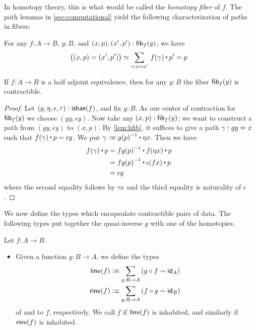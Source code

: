 In homotopy theory, this is what would be called the \emph{homotopy fiber} of $f$.
The path lemmas in \autoref{sec:computational} yield the following characterization of paths in fibers:

\begin{lem}\label{lem:hfib}
  For any $f : A \to B$, $y : B$, and $(x,p),(x',p') : {\mathsf{fib}}_{f}(y)$, we have
  \[ \big((x,p) = (x',p')\big) \simeq \sm{\gamma : x = x'} f(\gamma) \ct p' = p \qedhere\]
\end{lem}

\begin{thm}\label{thm:contr-hae}
  If $f:A\to B$ is a half adjoint equivalence, then for any $y:B$ the fiber ${\mathsf{fib}}_{f}(y)$ is contractible.
\end{thm}
\begin{proof}
  Let $(g,\eta,\epsilon,\tau) : \mathsf{ishae}(f)$, and fix $y : B$.
  As our center of contraction for ${\mathsf{fib}}_{f}(y)$ we choose $(gy, \epsilon y)$.
  Now take any $(x,p) : {\mathsf{fib}}_{f}(y)$; we want to construct a path from $(gy, \epsilon y)$ to $(x,p)$.
  By \autoref{lem:hfib}, it suffices to give a path $\gamma : gy =_{} x$ such that $\ap f\gamma \ct p = \epsilon y$.
  We put $\gamma \defeq \opp{g(p)} \ct \eta x$.
  Then we have 
  \begin{align*}
    f(\gamma) \ct p & = \opp{fg(p)} \ct f (\eta x) \ct p \\
    & = \opp{fg(p)} \ct \epsilon(fx) \ct p \\
    & = \epsilon y
  \end{align*}
  where the second equality follows by $\tau x$ and the third equality is naturality of $\epsilon$.
\end{proof}

We now define the types which encapsulate contractible pairs of data.
The following types put together the quasi-inverse $g$ with one of the homotopies.

\begin{defn}
  Let $f:A\to B$.
  \begin{itemize}
  \item Given a function $g:B\to A$, we define the types 
    \begin{align*}
      \linv(f) &\defeq \sm{g:B\to A} (g\circ f\htpy \idfunc[A])\\
      \rinv(f) &\defeq \sm{g:B\to A} (f\circ g\htpy \idfunc[B])
    \end{align*}
  of  and  to $f$, respectively.
  We call $f$  if $\mathsf{linv}(f)$ is inhabited, and similarly  if $\mathsf{rinv}(f)$ is inhabited.
  \end{itemize}
\end{defn}

